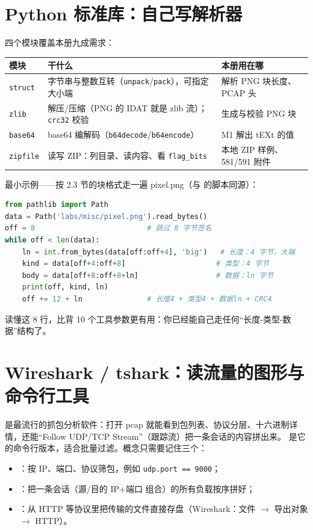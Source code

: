 \documentclass[UTF8,12pt,oneside]{ctexbook}
\begin{document}
\section{Python 标准库：自己写解析器}
四个模块覆盖本册九成需求：
\begin{center}
\begin{tabular}{p{}p{}p{}}
\toprule
模块 & 干什么 & 本册用在哪 \\
\midrule
\texttt{struct} & 字节串与整数互转（\texttt{unpack}/\texttt{pack}），可指定大小端 & 解析 PNG 块长度、PCAP 头 \\
\texttt{zlib} & 解压/压缩（PNG 的 IDAT 就是 zlib 流）；\texttt{crc32} 校验 & 生成与校验 PNG 块 \\
\texttt{base64} & base64 编解码（\texttt{b64decode}/\texttt{b64encode}） & M1 解出 tEXt 的值 \\
\texttt{zipfile} & 读写 ZIP：列目录、读内容、看 \texttt{flag\_bits} & 本地 ZIP 样例、581/591 附件 \\
\bottomrule
\end{tabular}
\end{center}
最小示例——按 2.3 节的块格式走一遍 pixel.png（与 的脚本同源）：
\begin{lstlisting}[language=Python]
from pathlib import Path
data = Path('labs/misc/pixel.png').read_bytes()
off = 8                          # 跳过 8 字节签名
while off < len(data):
    ln = int.from_bytes(data[off:off+4], 'big')   # 长度：4 字节，大端
    kind = data[off+4:off+8]                     # 类型：4 字节
    body = data[off+8:off+8+ln]                  # 数据：ln 字节
    print(off, kind, ln)
    off += 12 + ln               # 长度4 + 类型4 + 数据ln + CRC4
\end{lstlisting}
读懂这 8 行，比背 10 个工具参数更有用：你已经能自己走任何“长度-类型-数据”结构了。

\section{Wireshark / tshark：读流量的图形与命令行工具}
 是最流行的抓包分析软件：打开 pcap 就能看到包列表、协议分层、十六进制详情，还能“Follow UDP/TCP Stream”（跟踪流）把一条会话的内容拼出来。 是它的命令行版本，适合批量过滤。概念只需要记住三个：
\begin{itemize}
\item {}：按 IP、端口、协议筛包，例如 \verb|udp.port == 9000|；
\item {}：把一条会话（源/目的 IP+端口 组合）的所有负载按序拼好；
\item {}：从 HTTP 等协议里把传输的文件直接存盘（Wireshark：文件 $\rightarrow$ 导出对象 $\rightarrow$ HTTP）。
\end{itemize}
\end{document}
